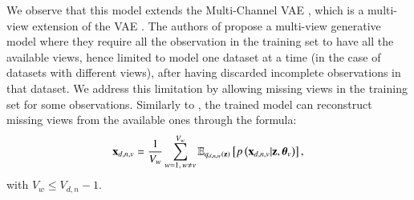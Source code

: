 We observe that this model extends the Multi-Channel VAE \cite{Antelmi2019}, which is a multi-view extension of the VAE \cite{Kingma2013,Rezende2014}.
The authors of \cite{Antelmi2019} propose a multi-view generative model where they require all the observation in the training set to have all the available views, hence limited to model one dataset at a time (in the case of datasets with different views), after having discarded incomplete observations in that dataset.
We address this limitation by allowing missing views in the training set for some observations.
Similarly to \cite{Antelmi2019}, the trained model can reconstruct missing views from the available ones through the formula:
\begin{equation}\label{eq:reconstruction}
\begin{aligned}
\mathbf{x}_{d,n,v} = \frac{1}{V_w} \sum_{w=1, \,w\neq v}^{V_w} \operatorname{\mathbb{E}}_{q_{d,n,w}(\mathbf{z})}\left[p\left(\mathbf{x}_{d,n,v}|\mathbf{z}, \boldsymbol{\theta}_v\right)\right],
\end{aligned}
\end{equation}
with $V_w \leq V_{d,n} - 1$.

